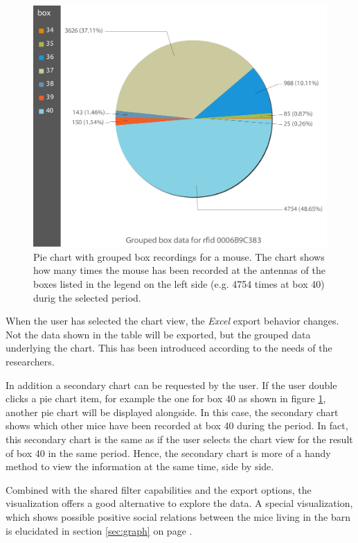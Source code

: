 \begin{figure}[htpb]
\begin{center}
  \includegraphics[width=.66\textwidth]{assets/img/pie_chart_for_mouse.png}
  \caption[Pie chart of result data for a mouse]{Pie chart with grouped box recordings for a mouse. The chart shows how many times the mouse has been recorded at the antennas of the boxes listed in the legend on the left side (e.g. 4754 times at box 40) durig the selected period.}
  \label{fig:pie_chart_for_mouse}
\end{center}
\end{figure}

When the user has selected the chart view, the \textit{Excel} export behavior changes. Not the data shown in the table will be exported, but the grouped data underlying the chart. This has been introduced according to the needs of the researchers.

In addition a secondary chart can be requested by the user. If the user double clicks a pie chart item, for example the one for box 40 as shown in figure \ref{fig:pie_chart_for_mouse}, another pie chart will be displayed alongside. In this case, the secondary chart shows which other mice have been recorded at box 40 during the period. In fact, this secondary chart is the same as if the user selects the chart view for the result of box 40 in the same period. Hence, the secondary chart is more of a handy method to view the information at the same time, side by side.

Combined with the shared filter capabilities and the export options, the visualization offers a good alternative to explore the data. A special visualization, which shows possible positive social relations between the mice living in the barn is elucidated in section \ref{sec:graph} on page \pageref{sec:graph}.

